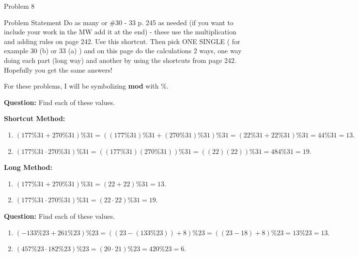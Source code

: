 \begin{problem}{Problem 8}
    \begin{statement}{Problem Statement}
        Do as many or \#30 - 33 p. 245 as needed (if you want to include your work in the MW add it at the end)  - these use the multiplication and adding rules on page 242. Use this shortcut. Then pick ONE 
        SINGLE ( for example 30 (b) or 33 (a) ) and on this page do the calculations 2 ways, one way doing each part (long way) and another by using the shortcuts from page 242. Hopefully you get the same 
        answers!
    \end{statement}

    For these problems, I will be symbolizing \textbf{mod} with \%.

    \begin{highlight}[Solution - \#30]
        \noindent \textbf{Question:} Find each of these values. \vspace*{1em}

        \textbf{Shortcut Method:}
        \begin{enumerate}[label=(\alph*)]
            \item $(177 \% 31 + 270 \% 31) \% 31 = ((177 \% 31) \% 31 + (270 \% 31) \% 31) \% 31 = (22 \% 31 + 22 \% 31) \% 31 = 44 \% 31 = 13.$
            \item $(177 \% 31 \cdot 270 \% 31) \% 31 = ((177 \% 31)(270 \% 31)) \% 31 = ((22)(22)) \% 31 = 484 \% 31 = 19.$
        \end{enumerate}

        \textbf{Long Method:}
        \begin{enumerate}[label=(\alph*)]
            \item $(177 \% 31 + 270 \% 31) \% 31 = (22 + 22) \% 31 = 13.$
            \item $(177 \% 31 \cdot 270 \% 31) \% 31 = (22 \cdot 22) \% 31 = 19.$
        \end{enumerate}
    \end{highlight}

    \begin{highlight}[Solution - \#31]
        \noindent \textbf{Question:} Find each of these values.
        
        \begin{enumerate}[label=(\alph*)]
            \item $(-133 \% 23 + 261 \% 23) \% 23 = ((23 - (133 \% 23)) + 8) \% 23 = ((23 - 18) + 8) \% 23 = 13 \% 23 = 13.$
            \item $(457 \% 23 \cdot 182 \% 23) \% 23 = (20 \cdot 21) \% 23 = 420 \% 23 = 6.$
        \end{enumerate}
    \end{highlight}


\end{problem}
